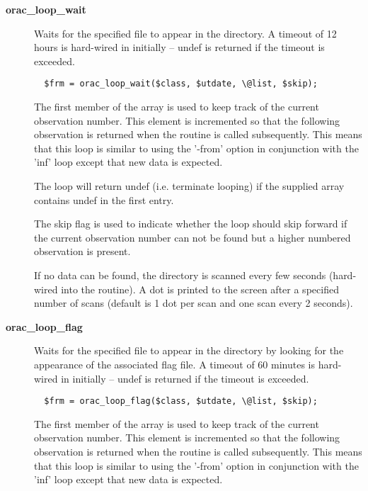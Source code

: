 \begin{description}
\begin{description}
\begin{description}
\item[{\textbf{orac\_loop\_wait}}] \mbox{}

Waits for the specified file to appear in the directory.
A timeout of 12 hours is hard-wired in initially -- undef
is returned if the timeout is exceeded.

\begin{verbatim}
  $frm = orac_loop_wait($class, $utdate, \@list, $skip);
\end{verbatim}


The first member of the array is used to keep track of the
current observation number. This element is incremented so that
the following observation is returned when the routine is called
subsequently. This means that this loop is similar to using the
'-from' option in conjunction with the 'inf' loop except that
new data is expected.



The loop will return undef (i.e. terminate looping) if the
supplied array contains undef in the first entry.



The skip flag is used to indicate whether the loop should skip
forward if the current observation number can not be found
but a higher numbered observation is present.



If no data can be found, the directory is scanned every few seconds
(hard-wired into the routine). A dot is printed to the screen after
a specified number of scans (default is 1 dot per scan and one scan every
2 seconds).


\item[{\textbf{orac\_loop\_flag}}] \mbox{}

Waits for the specified file to appear in the directory
by looking for the appearance of the associated flag file.
A timeout of 60 minutes is hard-wired in initially -- undef
is returned if the timeout is exceeded.

\begin{verbatim}
  $frm = orac_loop_flag($class, $utdate, \@list, $skip);
\end{verbatim}


The first member of the array is used to keep track of the
current observation number. This element is incremented so that
the following observation is returned when the routine is called
subsequently. This means that this loop is similar to using the
'-from' option in conjunction with the 'inf' loop except that
new data is expected.




\end{description}
\end{description}
\end{description}
